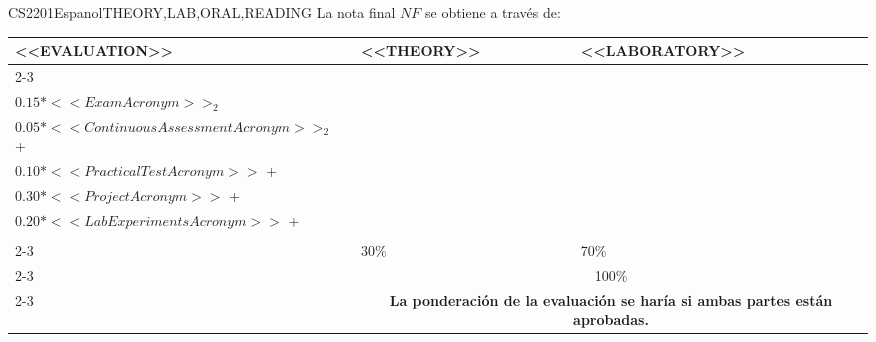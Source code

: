   \begin{evaluation}{CS2201}{Espanol}{THEORY,LAB,ORAL,READING}
  La nota final $NF$ se obtiene a través de:
  
  \begin{tabularx}{0.9\textwidth}{|X|p{}|p{}|} \hline
  \multirow{4}{*}{\uppercase{<<Evaluation>>}} & \uppercase{<<Theory>>} & \uppercase{<<Laboratory>>} \\ \cline{2-3}
  & %
      \begin{minipage}{0.95\textwidth}
      \begin{tabular}{l}
          $0.15*<<ExamAcronym>>_{1}$ + \\
          $0.15*<<ExamAcronym>>_{2}$
          \end{tabular} 
      \end{minipage} 
  & %
      \begin{minipage}{0.95\textwidth}
      \begin{tabular}{l}
          $0.05*<<ContinuousAssessmentAcronym>>_{1}$ + \\
          $0.05*<<ContinuousAssessmentAcronym>>_{2}$ + \\
          $0.10*<<PracticalTestAcronym>>$ + \\
          $0.30*<<ProjectAcronym>>$ + \\
          $0.20*<<LabExperimentsAcronym>>$ + \\
      \end{tabular} 
      \end{minipage}                 \\ \cline{2-3}
  & %
  30\% 
  & %
  70\% \\ \cline{2-3}
  & \multicolumn{2}{c|}{100\%}  \\ \cline{2-3}
  & \multicolumn{2}{c|}{\textbf{\textbf{La ponderación de la evaluación se haría si ambas partes están aprobadas.}}}  \\ \hline
  \end{tabularx}
    

\end{evaluation}
